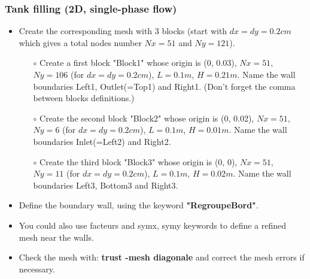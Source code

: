 \documentclass[10pt, hyperref={unicode=true,pdfusetitle, bookmarks=true,bookmarksnumbered=false,bookmarksopen=false, breaklinks=false,pdfborder={0 0 1},backref=true,colorlinks=true,linkcolor=darkblue,pageanchor}]{beamer}
\begin{document}
\begin{frame}
\frametitle{Tank filling (2D, single-phase flow)}
\begin{block}{}

\begin{itemize}
\item Create the corresponding mesh with 3 blocks (start with $dx=dy=0.2cm$ which gives a total nodes number $Nx=51$ and $Ny=121$). 
    \begin{itemize}
    \item [$\circ$] Create a first block "Block1" whose origin is (0, 0.03), $Nx=51$, $Ny=106$ (for $dx=dy=0.2cm$), $L=0.1 m$, $H=0.21 m$. Name the wall boundaries Left1, Outlet(=Top1) and Right1. (Don't forget the comma between blocks definitions.)
    \item [$\circ$] Create the second block "Block2" whose origin is (0, 0.02), $Nx=51$, $Ny=6$ (for $dx=dy=0.2cm$), $L=0.1 m$, $H=0.01 m$. Name the wall boundaries Inlet(=Left2) and Right2.
    \item [$\circ$] Create the third block "Block3" whose origin is (0, 0), $Nx=51$, $Ny=11$ (for $dx=dy=0.2cm$), $L=0.1 m$, $H=0.02 m$. Name the wall boundaries Left3, Bottom3 and Right3.
    \end{itemize}
\item Define the boundary wall, using the keyword \textbf{"RegroupeBord"}.
\item You could also use facteurs and symx, symy keywords to define a refined mesh near the walls. 
\item Check the mesh with: \textbf{trust -mesh diagonale} and correct the mesh errors if necessary.
\end{itemize}

\end{block}
\end{frame}
\end{document}
